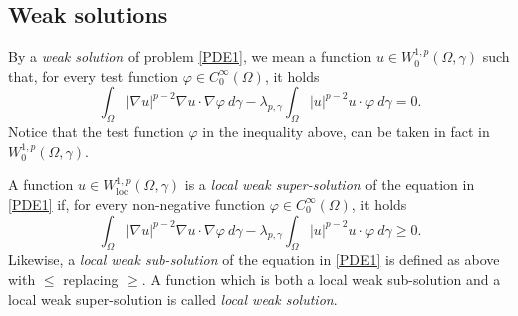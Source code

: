 \documentclass[12pt]{amsart}
\newcommand{\1}{\mathbf 1}
\begin{document}
\subsection{Weak solutions}
By a {\it weak solution} of problem \eqref{PDE1}, we mean a function $u\in W^{1,p}_{0}(\Omega,\gamma)$ such that, for every test function $\varphi\in C^{\infty}_0(\Omega)$, it holds
\begin{equation}\label{weak-solution}
\int_{\Omega} |\nabla u|^{p-2} \nabla u \cdot \nabla \varphi\ d\gamma -\lambda_{p,\gamma} \int_{\Omega}|u|^{p-2}u\cdot \varphi \ d\gamma= 0.
\end{equation}
Notice that the test function $\varphi$ in the inequality above, can be taken in fact in $W^{1,p}_{0}(\Omega,\gamma)$.

A function $u\in W^{1,p}_{\text{loc}}(\Omega,\gamma)$ is a {\it local weak super-solution} of the equation in \eqref{PDE1} if, for every non-negative function $\varphi\in C^{\infty}_0(\Omega)$, it holds
\begin{equation}\label{weak-supsolution}
\int_{\Omega} |\nabla u|^{p-2} \nabla u \cdot \nabla \varphi\ d\gamma -\lambda_{p,\gamma} \int_{\Omega}|u|^{p-2}u\cdot \varphi \ d\gamma\geq 0.
\end{equation}
Likewise, a {\it local weak sub-solution} of the equation in \eqref{PDE1} is defined as above with $\leq$ replacing $\geq$.
A function which is both a local weak sub-solution and a local weak super-solution is called {\it local weak solution}.


\end{document}
